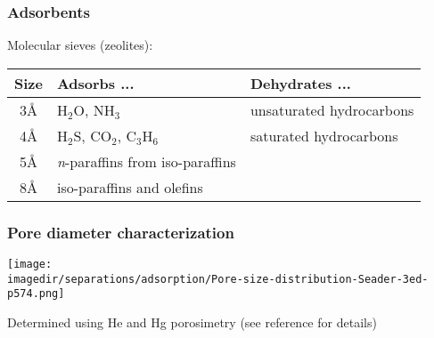 \begin{frame}\frametitle{Adsorbents}
	Molecular sieves (zeolites):
	
	\begin{tabular}{cll}\\
		\textbf{Size}	&	\textbf{Adsorbs} ... 					&	\textbf{Dehydrates} ...\vspace{6pt}\\ \hline 
		3\AA			&	$\text{H}_2\text{O}$, $\text{NH}_3$		& 	unsaturated hydrocarbons\\
		4\AA			&  	$\text{H}_2\text{S}$, $\text{CO}_2$, $\text{C}_3\text{H}_6$		& 	saturated hydrocarbons\\
		5\AA			&	\emph{n}-paraffins from iso-paraffins   & \\
		8\AA			& 	iso-paraffins and olefins				&	\\
	\end{tabular}
	\vspace{12pt}
\end{frame}

\begin{frame}\frametitle{Pore diameter characterization}
	\begin{center}
		\texttt{[image: \\imagedir/separations/adsorption/Pore-size-distribution-Seader-3ed-p574.png]}
	\end{center}
	{\scriptsize Determined using He and Hg porosimetry (see reference for details)}
\end{frame}

